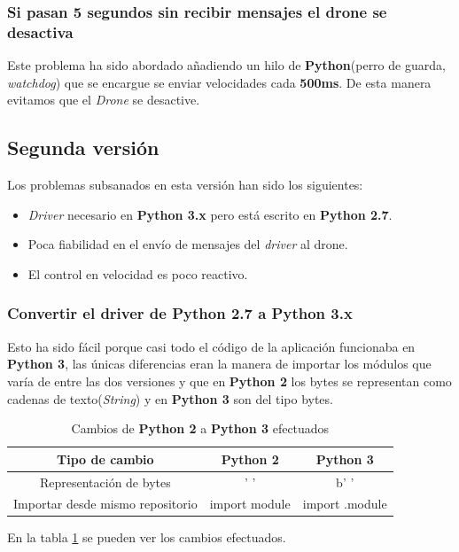 \subsubsection*{Si pasan 5 segundos sin recibir mensajes el drone se desactiva}
Este problema ha sido abordado añadiendo un hilo de \textbf{Python}(perro de guarda, \textit{watchdog}) que se encargue se enviar velocidades cada \textbf{500ms}. De esta manera evitamos que el \textit{Drone} se desactive.

\subsection{Segunda versión}
Los problemas subsanados en esta versión han sido los siguientes:
\begin{itemize}
  \item \textit{Driver} necesario en \textbf{Python 3.x} pero está escrito en \textbf{Python 2.7}. 
  \item Poca fiabilidad en el envío de mensajes del \textit{driver} al drone.
  \item El control en velocidad es poco reactivo.
\end{itemize}
\subsubsection*{Convertir el \textbf{driver} de Python 2.7 a Python 3.x}
Esto ha sido fácil porque casi todo el código de la aplicación funcionaba en\textbf{ Python 3}, las únicas diferencias eran la manera de importar los módulos que varía de entre las dos versiones y que en \textbf{Python 2} los bytes se representan como cadenas de texto(\textit{String}) y en \textbf{Python 3} son del tipo bytes.
\begin{table}[H]
\centering
\begin{tabular}{|c|c|c|}
\hline
\textbf{Tipo de cambio}          & \textbf{Python 2} & \textbf{Python 3} \\ \hline
Representación de bytes          & ' '               & b' '              \\ \hline
Importar desde mismo repositorio & import module     & import .module    \\ \hline
\end{tabular}
\caption{Cambios de \textbf{Python 2} a \textbf{Python 3} efectuados}
\label{tab:cambios_python_2_3}
\end{table}

En la tabla \ref{tab:cambios_python_2_3} se pueden ver los cambios efectuados.

